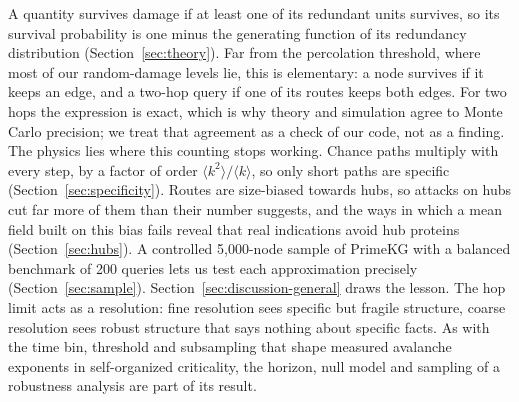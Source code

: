 A quantity survives damage if at least one of its redundant units survives, so
its survival probability is one minus the generating function of its
redundancy distribution (Section~\ref{sec:theory}). Far from the percolation
threshold, where most of our random-damage levels lie, this is elementary: a
node survives if it keeps an edge, and a two-hop query if one of its routes
keeps both edges. For two hops the expression is exact, which is why theory and
simulation agree to Monte Carlo precision; we treat that agreement as a check of
our code, not as a finding. The physics lies where this counting stops working.
Chance paths multiply with every step, by a factor of order
$\langle k^2\rangle/\langle k\rangle$, so only short paths are specific
(Section~\ref{sec:specificity}). Routes are size-biased towards hubs, so attacks
on hubs cut far more of them than their number suggests, and the ways in which
a mean field built on this bias fails reveal that real indications avoid hub
proteins (Section~\ref{sec:hubs}). A controlled 5,000-node sample of PrimeKG with a
balanced benchmark of 200 queries lets us test each approximation precisely
(Section~\ref{sec:sample}). Section~\ref{sec:discussion-general} draws the
lesson. The hop limit acts as a resolution:
fine resolution sees specific but fragile structure, coarse resolution sees
robust structure that says nothing about specific facts. As with the time bin,
threshold and subsampling that shape measured avalanche exponents in
self-organized criticality, the horizon, null model and sampling of a robustness
analysis are part of its result.
